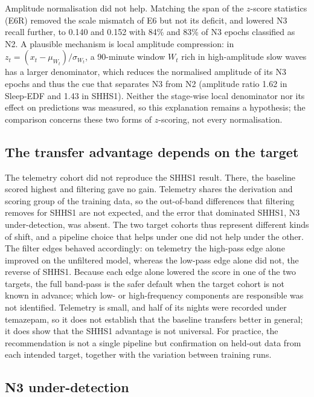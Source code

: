 \documentclass[11pt,a4paper]{article}
\begin{document}
Amplitude normalisation did not help. Matching the span of the $z$-score statistics (E6R) removed the
scale mismatch of E6 but not its deficit, and lowered N3 recall further, to 0.140 and 0.152 with
84\% and 83\% of N3 epochs classified as N2. A plausible mechanism is local amplitude compression: in
$z_t=(x_t-\mu_{W_t})/\sigma_{W_t}$, a 90-minute window $W_t$ rich in high-amplitude slow waves has a
larger denominator, which reduces the normalised amplitude of its N3 epochs and thus the cue that
separates N3 from N2 (amplitude ratio 1.62 in Sleep-EDF and 1.43 in SHHS1). Neither the stage-wise
local denominator nor its effect on predictions was measured, so this explanation remains a
hypothesis; the comparison concerns these two forms of $z$-scoring, not every normalisation.

\subsection{The transfer advantage depends on the target}

The telemetry cohort did not reproduce the SHHS1 result. There, the baseline scored highest and
filtering gave no gain. Telemetry shares the derivation and scoring group of the training data, so the out-of-band differences that filtering removes for SHHS1 are not expected, and
the error that dominated SHHS1, N3 under-detection, was absent. The two target cohorts thus represent
different kinds of shift, and a pipeline choice that helps under one did not help under the other.
The filter edges behaved accordingly: on telemetry the high-pass edge alone improved on the
unfiltered model, whereas the low-pass edge alone did not, the reverse of SHHS1. Because each edge
alone lowered the score in one of the two targets, the full band-pass is the safer default when the
target cohort is not known in advance; which low- or high-frequency components are responsible was not
identified.
Telemetry is small, and half of its nights were recorded under temazepam, so it does not establish
that the baseline transfers better in general; it does show that the SHHS1 advantage is not
universal. For practice, the recommendation is not a single pipeline but confirmation on held-out
data from each intended target, together with the variation between training runs.

\subsection{N3 under-detection}
\end{document}
